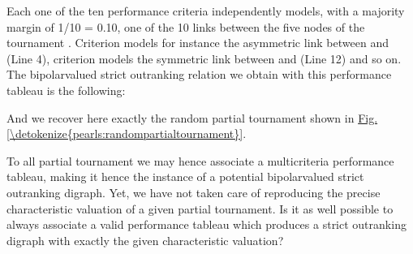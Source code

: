 \documentclass[a4paper,12pt,english]{sphinxhowto}
\begin{document}
\sphinxAtStartPar
Each one of the ten performance criteria independently models, with a majority margin of 1/10 = 0.10,  one of the 10 links between the five nodes of the tournament .  Criterion  models for instance the asymmetric link between  and  (Line 4), criterion  models the symmetric link between  and  (Line 12) and so on. The bipolar\sphinxhyphen{}valued strict outranking relation we obtain with this performance tableau is the following:

\begin{sphinxVerbatim}[commandchars=\\\{\},numbers=left,firstnumber=1,stepnumber=1]
\end{sphinxVerbatim}

\sphinxAtStartPar
And we recover here exactly the random partial tournament shown in \hyperref[\detokenize{pearls:randompartialtournament}]{Fig.\@ \ref{\detokenize{pearls:randompartialtournament}}}.

\sphinxAtStartPar
To all partial tournament we may hence associate a multicriteria performance tableau, making it hence the instance of a potential bipolar\sphinxhyphen{}valued strict outranking digraph. Yet, we have not taken care of reproducing the precise characteristic valuation of a given partial tournament. Is it as well possible to always associate a valid performance tableau which produces a strict outranking digraph with exactly the given characteristic valuation?
\end{document}
